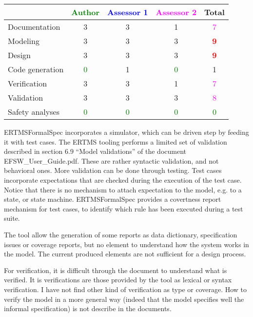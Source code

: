 \begin{tabular}{|l | c | c | c | c|}
\hline
& \textcolor{green}{Author} & \textcolor{blue}{Assessor 1} & \textcolor{magenta}{Assessor 2} & Total \\
\hline 
Documentation & 3    & 3    & 1    & \textcolor{magenta}{7} \\
\hline
Modeling & 3    & 3    & 3    & \textcolor{red}{\textbf{9}} \\
\hline
Design & 3    & 3    & 3    & \textcolor{red}{\textbf{9}} \\
\hline
Code generation & \textcolor{green}{0} & 1    & \textcolor{green}{0} & 1   \\
\hline
Verification & 3    & 3    & 1    & \textcolor{magenta}{7} \\
\hline
Validation & 3    & 3    & 3    & \textcolor{magenta}{8} \\
\hline
Safety analyses & \textcolor{green}{0} & \textcolor{green}{0} & \textcolor{green}{0} & \textcolor{green}{0} \\
\hline
\end{tabular}

\begin{assessor1}
ERTMSFormalSpec incorporates a simulator, which can be driven step by feeding it with test cases. 
The ERTMS tooling performs a limited set of validation described in section 6.9 "`Model validations"' of the document EFSW\_User\_Guide.pdf. These are rather syntactic validation, and not behavioral ones. More validation can be done through testing. Test cases incorporate expectations that are checked during the execution of the test case. Notice that there is no mechanism to attach expectation to the model, e.g. to a state, or state machine. ERTMSFormalSpec provides a covertness report mechanism for test cases, to identify which rule has been executed during a test suite. 
\end{assessor1}

\begin{assessor2}
The tool allow the generation of some reports as data dictionary, specification issues or coverage reports, but no element to understand how the system works in the model. The current produced elements are not sufficient for a design process.

For verification, it is difficult through the document to understand what is verified. It is verifications are those provided by the tool as lexical or syntax verification. I have not find other kind of verification as type or coverage. How to verify the model in a more general way (indeed that the model specifies well the informal specification) is not describe in the documents.
\end{assessor2}


